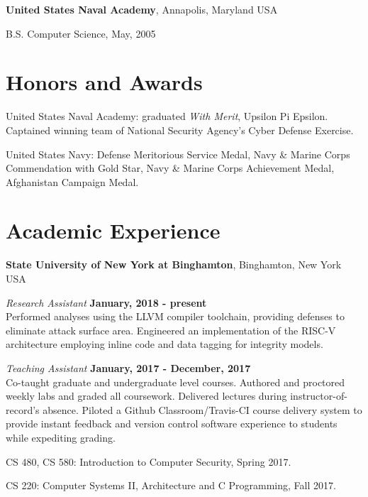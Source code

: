 \documentclass[margin,line]{res}
\begin{document}
\begin{resume}
{\bf United States Naval Academy}, Annapolis, Maryland USA\\
\vspace*{-.1in}
\begin{list2}
\item[] B.S. Computer Science,  May, 2005
\end{list2}

\section{\sc Honors and Awards} 

United States Naval Academy: graduated \textit{With Merit}, Upsilon Pi Epsilon. Captained winning team of National Security Agency's Cyber Defense Exercise.

United States Navy: Defense Meritorious Service Medal, Navy \& Marine Corps Commendation with Gold Star, Navy \& Marine Corps Achievement Medal, Afghanistan Campaign Medal.

\section{\sc Academic Experience}

{\bf State University of New York at Binghamton}, Binghamton, New York USA

\vspace{-.3cm}
{\em Research Assistant} \hfill {\bf January, 2018 - present}\\
Performed analyses using the LLVM compiler toolchain, providing defenses to eliminate attack surface area. Engineered an implementation of the RISC-V architecture employing inline code and data tagging for integrity models.

\vspace{-.1cm}
{\em Teaching Assistant} \hfill {\bf January, 2017 - December, 2017}\\  
Co-taught graduate and undergraduate level courses. Authored and proctored weekly labs and graded all coursework. Delivered lectures during instructor-of-record's absence. Piloted a Github Classroom/Travis-CI course delivery system to provide instant feedback and version control software experience to students while expediting grading.

\vspace*{.05in}  
\begin{list2}
\item CS 480, CS 580: Introduction to Computer Security, Spring 2017.
\item CS 220: Computer Systems II, Architecture and C Programming, Fall 2017.
\end{list2}


\end{resume}
\end{document}
